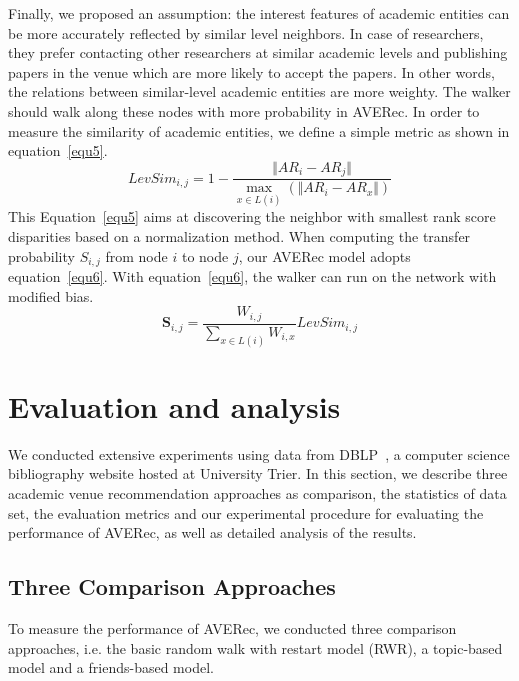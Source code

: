 \documentclass[9pt]{acm_proc_article-sp}
\begin{document}
Finally, we proposed an assumption: the interest features of academic entities can be more accurately reflected by similar level neighbors. In case of researchers, they prefer contacting other researchers at similar academic levels and publishing papers in the venue which are more likely to accept the papers. In other words, the relations between similar-level academic entities are more weighty. The walker should walk along these nodes with more probability in AVERec. In order to measure the similarity of academic entities, we define a simple metric as shown in equation~\ref{equ5}.
\begin{equation}
\label{equ5}
LevSim_{i,j}=1-\frac{\Vert AR_{i}-AR_{j}\Vert}{\max_{x\in L(i)}(\Vert AR_{i}-AR_{x}\Vert)}
\end{equation}
This Equation~\ref{equ5} aims at discovering the neighbor with smallest rank score disparities based on a normalization method. When computing the transfer probability $S_{i,j}$ from node $i$ to node $j$, our AVERec model adopts equation~\ref{equ6}. With equation~\ref{equ6}, the walker can run on the network with modified bias.
\begin{equation}
\label{equ6}
\mathbf{S}_{i,j}=\frac{W_{i,j}}{\sum_{x\in L(i)}W_{i,x}}LevSim_{i,j}
\end{equation}

\section{Evaluation and analysis}
\label{section:evaluation}
We conducted extensive experiments using data from DBLP~\cite{Ley:DBLP}, a computer science bibliography website hosted at University Trier. In this section, we describe three academic venue recommendation approaches as comparison, the statistics of data set, the evaluation metrics and our experimental procedure for evaluating the performance of AVERec, as well as detailed analysis of the results.

\subsection{Three Comparison Approaches}
To measure the performance of AVERec, we conducted three comparison approaches, i.e. the basic random walk with restart model (RWR), a topic-based model and a friends-based model.
\end{document}
